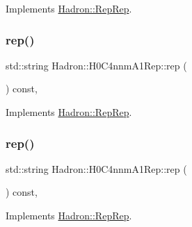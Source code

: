 Implements \mbox{\hyperlink{structHadron_1_1RepRep_ab3213025f6de249f7095892109575fde}{Hadron\+::\+Rep\+Rep}}.

\mbox{\label{structHadron_1_1H0C4nnmA1Rep_a99c77d4cddc66d00c5fbeb5e4927dfba}} 
\subsubsection{\texorpdfstring{rep()}{rep()}\hspace{0.1cm}{\footnotesize\ttfamily [2/5]}}
{\footnotesize\ttfamily std\+::string Hadron\+::\+H0\+C4nnm\+A1\+Rep\+::rep (\begin{DoxyParamCaption}{ }\end{DoxyParamCaption}) const\hspace{0.3cm}{\ttfamily [inline]}, {\ttfamily [virtual]}}



Implements \mbox{\hyperlink{structHadron_1_1RepRep_ab3213025f6de249f7095892109575fde}{Hadron\+::\+Rep\+Rep}}.

\mbox{\label{structHadron_1_1H0C4nnmA1Rep_a99c77d4cddc66d00c5fbeb5e4927dfba}} 
\subsubsection{\texorpdfstring{rep()}{rep()}\hspace{0.1cm}{\footnotesize\ttfamily [3/5]}}
{\footnotesize\ttfamily std\+::string Hadron\+::\+H0\+C4nnm\+A1\+Rep\+::rep (\begin{DoxyParamCaption}{ }\end{DoxyParamCaption}) const\hspace{0.3cm}{\ttfamily [inline]}, {\ttfamily [virtual]}}



Implements \mbox{\hyperlink{structHadron_1_1RepRep_ab3213025f6de249f7095892109575fde}{Hadron\+::\+Rep\+Rep}}.

\mbox{\label{structHadron_1_1H0C4nnmA1Rep_a99c77d4cddc66d00c5fbeb5e4927dfba}} 
